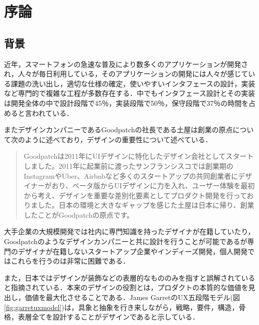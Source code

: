\chapter{序論}
\label{chap:introduction}

\section{背景}
近年，スマートフォンの急速な普及により数多くのアプリケーションが開発され，人々が毎日利用している，そのアプリケーションの開発には人々が感じている課題の洗い出し，適切な仕様の確定，使いやすいインタフェースの設計，実装など専門的で複雑な工程が多数存在する．中でもインタフェース設計とその実装は開発全体の中で設計段階で45％，実装段階で50％，保守段階で37％の時間を占めると言われている\cite{myers1992survey}．

またデザインカンパニーであるGoodpatchの社長である土屋は創業の原点について次のように述べており，デザインの重要性について述べている．

\begin{quotation}
Goodpatchは2011年にUIデザインに特化したデザイン会社としてスタートしました。2011年に起業前に渡ったサンフランシスコでは創業期のInstagramやUber、Airbnbなど多くのスタートアップの共同創業者にデザイナーがおり、ベータ版からUIデザインに力を入れ、ユーザー体験を最初から考え、デザインを重要な差別化要素としてプロダクト開発を行っておりました。日本の環境と大きなギャップを感じた土屋は日本に帰り、創業したことがGoodpatchの原点です。\cite{goodpatchwhydesign}
\end{quotation}

大手企業の大規模開発では社内に専門知識を持ったデザイナが在籍していたり，Goodpatchのようなデザインカンパニーと共に設計を行うことが可能であるが専門のデザイナが在籍しないスタートアップ企業やインディーズ開発，個人開発ではこれらを行うのは非常に困難である．

また，日本ではデザインが装飾などの表層的なもののみを指すと誤解されていると指摘されている\cite{goodpatchwhydesign}．本来のデザインの役割とは，プロダクトの本質的な価値を見出し，価値を最大化させることである．James GarretのUX五段階モデル(図\ref{fig:garretuxmodel})は，具象と抽象を行き来しながら，戦略，要件，構造，骨格，表層全てを設計することがデザインであると示している．

